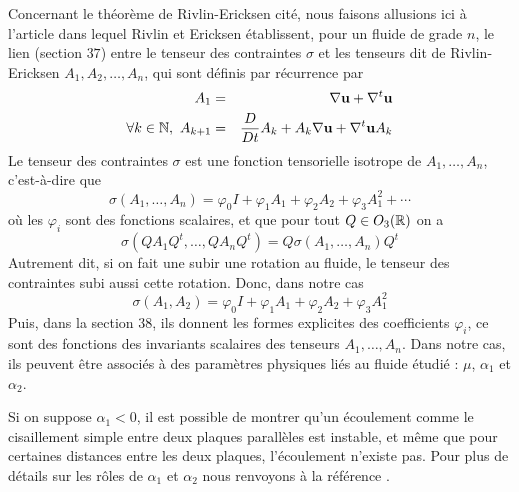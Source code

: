 \begin{remark}
    Concernant le \og théorème de Rivlin-Ericksen \fg{} cité, nous faisons allusions ici à l'article \cite{Rivlin1955} dans lequel  Rivlin et Ericksen établissent, pour un fluide de grade $n$, le lien (section $37$) entre le tenseur des contraintes $\sigma$ et les tenseurs dit de Rivlin-Ericksen $A_1, A_2, \dots, A_n$, qui sont définis par récurrence par 
    \begin{eqnarray*}
        A_1 &=& \nabla \bm{\mathrm{u}} + \nabla^t \bm{\mathrm{u}} \\
        \forall k \in \mathbb{N}, \ A_{k+1} &=& \frac{D}{Dt}A_k + A_k \nabla \bm{\mathrm{u}} + \nabla^t\bm{\mathrm{u}}A_k
    \end{eqnarray*}
    Le tenseur des contraintes $\sigma$ est une fonction tensorielle isotrope de $A_1,\dots, A_n$, c'est-à-dire que
    \begin{equation*}
        \sigma(A_1,\dots,A_n) = \varphi_0 I + \varphi_1 A_1 + \varphi_2A_2 + \varphi_3A_1^2 + \cdots
    \end{equation*}
    où les $\varphi_i$ sont des fonctions scalaires, et que pour tout $Q \in O_3(\mathbb{R})$ on a 
    \begin{equation*}
        \sigma(QA_1Q^t, \dots, QA_nQ^t) = Q \sigma (A_1,\dots, A_n) Q^t
    \end{equation*}
    Autrement dit, si on fait une subir une rotation au fluide, le tenseur des contraintes subi aussi cette rotation. Donc, dans notre cas
    \begin{equation*}
        \sigma(A_1,A_2) = \varphi_0 I + \varphi_1 A_1 + \varphi_2A_2 + \varphi_3A_1^2
    \end{equation*}
    Puis, dans la section $38$, ils donnent les formes explicites des coefficients $\varphi_i$, ce sont des fonctions des invariants scalaires des tenseurs $A_1,\dots, A_n$. Dans notre cas, ils peuvent être associés à des paramètres physiques liés au fluide étudié : $\mu$, $\alpha_1$ et $\alpha_2$. \\
\end{remark}

\begin{remark}
    Si on suppose $\alpha_1<0$, il est possible de montrer qu'un écoulement comme le cisaillement simple entre deux plaques parallèles est instable, et même que pour certaines distances entre les deux plaques, l'écoulement n'existe pas. Pour plus de détails sur les rôles de $\alpha_1$ et $\alpha_2$ nous renvoyons à la référence \cite[p.~211]{thermo_fluid_2}.
\end{remark}

